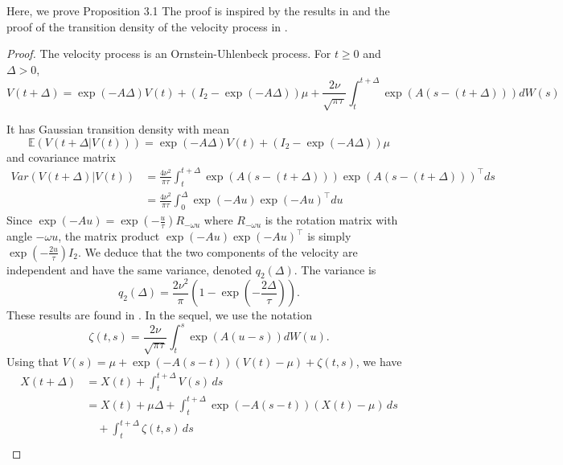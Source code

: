 \documentclass[aoas]{imsart}
\theoremstyle{definition}
\theoremstyle{remark}
\theoremstyle{remark}
\newcommand {\E}{\mathbb{E}}
\newcommand {\1}{\mathbb{1}}
\begin{document}
Here, we prove Proposition 3.1 The proof is inspired by the results in \citep{gurarie_correlated_2017,johnson_continuous_2008} and the proof of the transition density of the velocity process in \citep{albertsen_generalizing_2018}.
\begin{proof}
	The velocity process is an Ornstein-Uhlenbeck process. For $t \geq 0$ and $\Delta >0$,
	\begin{equation}
		V(t+\Delta)=\exp(-A\Delta) V(t)+ (I_2-\exp(-A\Delta))\mu +\frac{2\nu}{\sqrt{\pi \tau}}\int_{t}^{t+\Delta} \exp(A(s-(t+\Delta))) dW(s)
		\label{eq: RACVM solution}
	\end{equation}
	
	It has Gaussian transition density with mean 
	\begin{equation}
		\E(V(t+\Delta \vert V(t)))=\exp(-A\Delta) V(t)+ (I_2-\exp(-A\Delta))\mu 
	\end{equation}
	and covariance matrix 
	\begin{align*}Var(V(t+\Delta) \vert V(t))&=\frac{4\nu^2}{\pi \tau} \int_{t}^{t+\Delta} \exp(A(s-(t+\Delta))) \exp(A(s-(t+\Delta)))^{\top} ds\\
		&=\frac{4\nu^2}{\pi \tau} \int_{0}^{\Delta} \exp(-Au) \exp(-Au)^{\top} du 
	\end{align*}
	Since $\exp(-Au)=\exp(-\frac{u}{\tau}) R_{-\omega u}$ where $R_{-\omega u}$ is the rotation matrix with angle $-\omega u$, the matrix product  $\exp(-Au) \exp(-Au)^{\top}$ is simply $\exp(-\frac{2u}{\tau}) I_2$. We deduce that the two components of the velocity are independent and have the same variance, denoted  $q_2(\Delta)$. The variance is 
	\begin{equation}
		q_2(\Delta)=\frac{2\nu^2}{\pi}\left(1-\exp\left(-\frac{2\Delta}{\tau}\right)\right).
	\end{equation}
	These results are found in \cite{gurarie_correlated_2017}.
	In the sequel, we  use the notation 
	\[\zeta(t,s) =\frac{2\nu}{\sqrt{\pi \tau}}\int_{t}^{s} \exp(A(u-s)) dW(u).\] 
	Using that $V(s)=\mu+\exp(-A(s-t))(V(t)-\mu)+\zeta(t,s)$, we have
\begin{align*}
    X(t+\Delta) &= X(t) + \int_t^{t+\Delta} V(s) \, ds \\
    &= X(t) + \mu \Delta + \int_t^{t+\Delta} \exp(-A(s-t))(X(t) - \mu) \, ds \\
    &\quad + \int_t^{t+\Delta} \zeta(t,s) \, ds \\

\end{align*}
\end{proof}
\end{document}

